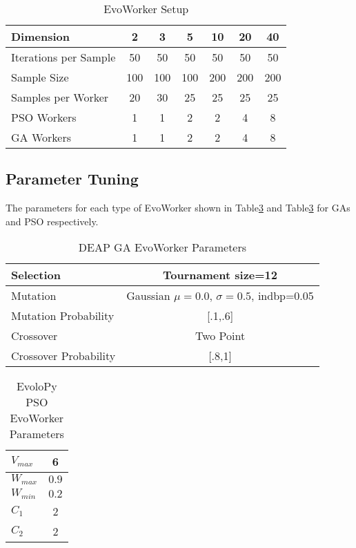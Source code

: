 \documentclass[sigconf]{acmart}
\begin{document}
\begin{table}
  \small
  \caption{EvoWorker Setup}
  \label{tab:params} 
  \centering
  \small
  \begin{tabular}{|l|c|c|c|c|c|c|}
    \hline
    Dimension & 2 & 3 & 5 & 10 & 20 & 40\\ \hline
    Iterations per Sample  & 50 & 50 & 50 & 50 & 50 & 50\\ \hline
    Sample Size  & 100 & 100 & 100 & 200 & 200 & 200 \\ \hline
    Samples per Worker & 20 & 30 & 25 & 25 & 25 & 25  \\ \hline
    PSO Workers & 1 & 1 & 2 & 2 & 4 & 8  \\ \hline
    GA Workers & 1 & 1 & 2 & 2 & 4 & 8  \\ \hline
  \end{tabular}
\end{table}


\subsection{Parameter Tuning}
The parameters for each type of EvoWorker shown in Table\ref{tab:GAparams}
and Table\ref{tab:GAparams} for GAs and PSO respectively.
\begin{table}
  \small
  \caption{ DEAP GA EvoWorker Parameters }
  \label{tab:GAparams} 
  \centering
  \small
  \begin{tabular}{|l|c|}
    \hline
    Selection & Tournament size=12\\ \hline
    Mutation & Gaussian $\mu=0.0$, $\sigma=0.5$, indbp=0.05  \\ \hline
    Mutation Probability & [.1,.6]  \\ \hline
    Crossover & Two Point  \\ \hline
    Crossover Probability& [.8,1]  \\ \hline
  \end{tabular}
\end{table}

\begin{table}
  \small
  \caption{ EvoloPy PSO EvoWorker Parameters }
  \label{tab:GAparams} 
  \centering
  \small
  \begin{tabular}{|l|c|}
    \hline
    $V_{max}$ & 6 \\ \hline
    $W_{max}$ & $0.9$ \\ \hline
    $W_{min}$ & $0.2$ \\ \hline
    $C_1$ & 2 \\ \hline
    $C_2$ & 2 \\ \hline
  \end{tabular}
\end{table}
\end{document}
